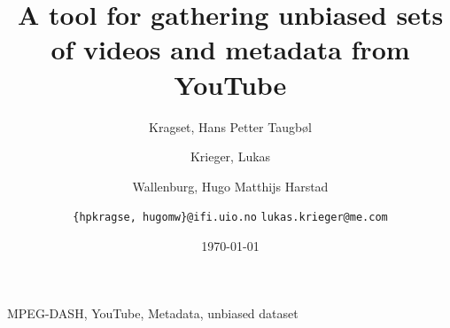 \documentclass[10pt,journal]{IEEEtran}
\title{A tool for gathering unbiased sets of videos and metadata from YouTube}
\author{
	Kragset, Hans Petter Taugb\o l
	\and
	Krieger, Lukas
	\and
	Wallenburg, Hugo Matthijs Harstad
	\and
	\newline
	\texttt{\{hpkragse, hugomw\}@ifi.uio.no}
	\texttt{lukas.krieger@me.com}
}
\date{\today}
\begin{document}
\maketitle

\begin{abstract}
    
\end{abstract}

\begin{IEEEkeywords}
    MPEG-DASH, YouTube, Metadata, unbiased dataset
\end{IEEEkeywords}














\end{document}
